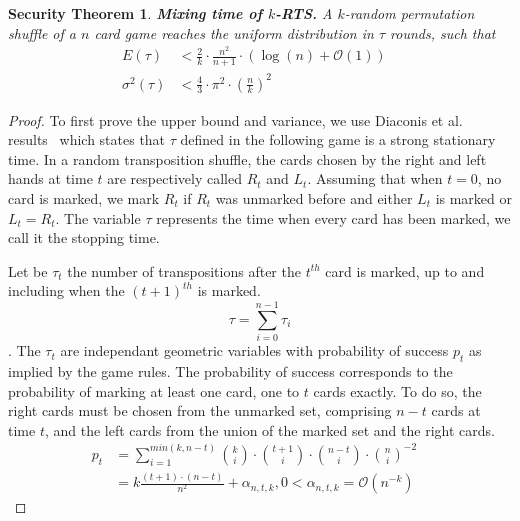 \documentclass[english,oneside,twocolumn]{article}
\newtheorem{secthm}{Security Theorem}
\begin{document}
\begin{secthm}
\textbf{Mixing time of $k$-RTS.} A $k$-random permutation shuffle of a $n$ card game reaches the uniform distribution in $\tau$ rounds, such that
\begin{align*}
E(\tau) &< \frac{2}{k}\cdot\frac{n^2}{n+1}\cdot \left ( \log(n) + \mathcal{O}(1) \right ) &\\
\sigma^2(\tau) &< \frac{4}{3} \cdot {\pi}^2 \cdot \left ( \frac{n}{k} \right )^2 &
\end{align*}
\end{secthm}

\begin{proof}
To first prove the upper bound and variance, we use Diaconis et al. results~\cite{aldous1986shuffling} which states that $\tau$ defined in the following game is a strong stationary time.
In a random transposition shuffle, the cards chosen by the right and left hands at time $t$ are respectively called $R_t$ and $L_t$. Assuming that when $t=0$, no card is marked, we mark $R_t$ if
$R_t$ was unmarked before and either $L_t$ is marked or $L_t = R_t$. The variable $\tau$ represents the time when every card has been marked, we call it the stopping time.

Let be $\tau_t$ the number of transpositions after the $t^{th}$ card is marked, up to and including when the $(t+1)^{th}$ is marked. $$\tau = \sum_{i=0}^{n-1} \tau_i$$.
The $\tau_t$ are independant geometric variables with probability of success $p_t$ as implied by the game rules.
The probability of success corresponds to the probability of marking at least one card, one to $t$ cards exactly. To do so, the right cards must be chosen from the unmarked set, comprising $n-t$ cards at time $t$,
and the left cards from the union of the marked set and the right cards.
\begin{align*}
 p_t &= \sum_{i=1}^{min(k,n-t)} {k \choose i} \cdot {t+1 \choose i} \cdot {n-t \choose i}\cdot{n \choose i}^{-2}&\\
 &= k \frac{(t+1)\cdot(n-t)}{n^2} + \alpha_{n,t,k}, 0 < \alpha_{n,t,k} = \mathcal{O}\left(n^{-k}\right )
\end{align*}


\end{proof}
\end{document}
